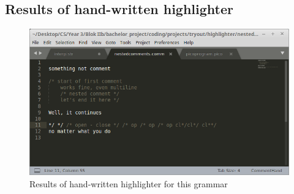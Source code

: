 \subsection{Results of hand-written highlighter}
\begin{figure}[h!]
	\centering
	\includegraphics[width=\textwidth, keepaspectratio]{Figures/highlightShots/comment_handwritten.png}
	\decoRule
 	\caption[Hand-written highlighter results for NestedComments grammar]{Results of hand-written highlighter for this grammar}
 	\label{fig:comments:highlighter:written}
\end{figure}
